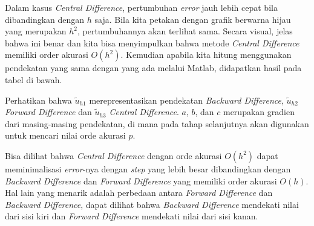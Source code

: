 \documentclass[10pt, a4paper, onecolumn, oneside, final]{report}
\begin{document}
Dalam kasus \textit{Central Difference}, pertumbuhan \textit{error} jauh lebih cepat bila dibandingkan dengan $h$ saja. Bila kita petakan dengan grafik berwarna hijau yang merupakan $h^2$, pertumbuhannya akan terlihat sama. Secara visual, jelas bahwa ini benar dan kita bisa menyimpulkan bahwa metode \textit{Central Difference} memiliki order akurasi $O(h^2)$. Kemudian apabila kita hitung menggunakan pendekatan yang sama dengan yang ada melalui Matlab, didapatkan hasil pada tabel di bawah.

Perhatikan bahwa $\tilde{u}_{h1}$ merepresentasikan pendekatan \textit{Backward Difference}, $\tilde{u}_{h2}$ \textit{Forward Difference} dan $\tilde{u}_{h3}$ \textit{Central Difference}. $a$, $b$, dan $c$ merupakan gradien dari masing-masing pendekatan, di mana pada tahap selanjutnya akan digunakan untuk mencari nilai orde akurasi $p$.

Bisa dilihat bahwa \textit{Central Difference} dengan orde akurasi $O(h^2)$ dapat meminimalisasi \textit{error}-nya dengan \textit{step} yang lebih besar dibandingkan dengan \textit{Backward Difference} dan \textit{Forward Difference} yang memiliki order akurasi $O(h)$. Hal lain yang menarik adalah perbedaan antara \textit{Forward Difference} dan \textit{Backward Difference}, dapat dilihat bahwa \textit{Backward Difference} mendekati nilai dari sisi kiri dan \textit{Forward Difference} mendekati nilai dari sisi kanan.
\end{document}
